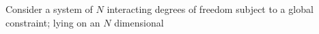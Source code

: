 Consider a system of $N$ interacting degrees of freedom subject to a global constraint; lying on an $N$ dimensional 